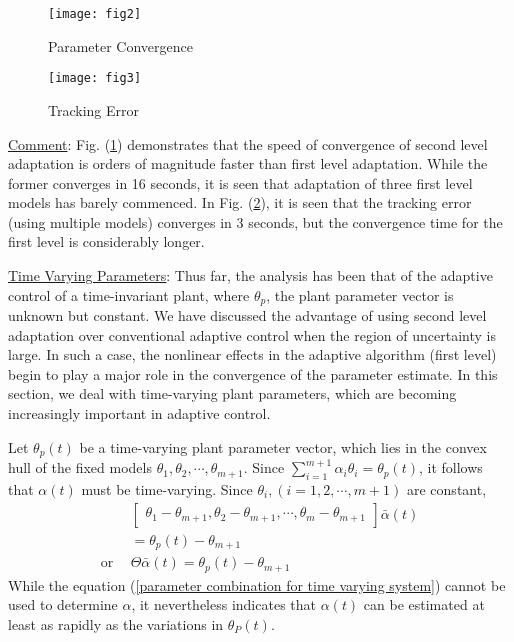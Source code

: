\documentclass[conference]{IEEEtran}
\begin{document}
\begin{figure}[H]
\texttt{[image: fig2]}
\caption{Parameter Convergence}
\label{Fig2}
\end{figure}
\begin{figure}[H]
\texttt{[image: fig3]}
\caption{Tracking Error}
\label{Fig3}
\end{figure}
{\large \underline{Comment}}: Fig. (\ref{Fig2}) demonstrates that the speed of convergence of second level adaptation is orders of magnitude faster than first level adaptation. While the former converges in 16 seconds, it is seen that adaptation of three first level models has barely commenced. In Fig. (\ref{Fig3}), it is seen that the tracking error (using multiple models) converges in 3 seconds, but the convergence time for the first level is considerably longer.



{\large \underline{Time Varying Parameters}}: Thus far, the analysis has been that of the adaptive control of a time-invariant plant, where $\theta_{p}$, the plant parameter vector is unknown but constant. We have discussed the advantage of using second level adaptation over conventional adaptive control when the region of uncertainty is large. In such a case, the  nonlinear effects in the adaptive algorithm (first level) begin to play a major role in the convergence of the parameter estimate. In this section, we deal with time-varying plant parameters, which are becoming increasingly important in adaptive control.

Let $\theta_{p}(t)$ be a time-varying plant parameter vector, which lies in the convex hull of the fixed models $\theta_{1},\theta_{2},\cdots,\theta_{m+1}$. Since $\sum_{i=1}^{m+1}\alpha_{i}\theta_{i}=\theta_{p}(t)$, it follows that $\alpha(t)$ must be time-varying. Since $\theta_{i},(i=1,2,\cdots,m+1)$ are constant,
\begin{equation}
\label{parameter combination for time varying system}
\begin{split}
&\left[\begin{array}{c}\theta_{1}-\theta_{m+1},\theta_{2}-\theta_{m+1},\cdots,\theta_{m}-\theta_{m+1}\end{array}\right] \bar{\alpha}(t)\\ &=\theta_{p}(t)-\theta_{m+1}\\
\text{or} \ \ &\Theta\bar{\alpha}(t)=\theta_{p}(t)-\theta_{m+1}
\end{split}
\end{equation}
While the equation (\ref{parameter combination for time varying system}) cannot be used to determine $\alpha$, it nevertheless indicates that $\alpha(t)$ can be estimated at least as rapidly as the variations  in $\theta_{P}(t)$.
\end{document}

